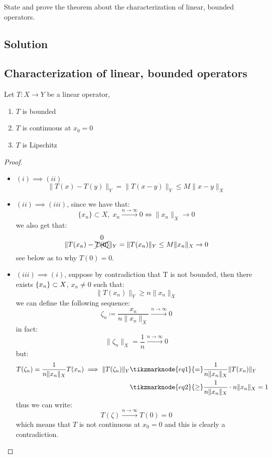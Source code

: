 
\question
State and prove the theorem about the characterization of linear, bounded operators.

\subsection*{Solution}

\subsection{Characterization of linear, bounded operators}
Let $T:X\to Y$ be a linear operator, \tfae
\begin{enumerate}
    \item $T$ is bounded
    \item $T$ is continuous at $x_0=0$
    \item $T$ is Lipschitz
\end{enumerate} 

\begin{proof}
    \hspace*{\fill}\\ %
    \begin{itemize}
        \item $(i) \implies (ii)$
            \[ \|T(x)-T(y)\|_Y = \|T(x-y)\|_Y \leq M \|x-y\|_X \]       
        \item $(ii) \implies (iii)$, since we have that:
            \[ \{x_n\}\subset X, \; x_n\xrightarrow{n\to\infty}0 \iff \|x_n\|_X \to 0 \]
            we also get that:
            \[ \|T(x_n)-\overset{\text{\normalsize0}}{\xcancel{T(0)}}\|_Y = \|T(x_n)\|_Y \leq M\|x_n\|_X \to 0\]
            see below as to why $T(0)=0$.
        \item $(iii) \implies (i)$, suppose by contradiction that T is not bounded, then there exists $\{ x_n \}\subset X$, $x_n\neq0$ such that:
            \[ \|T(x_n)\|_Y \geq n\|x_n\|_X \]
            we can define the following sequence:
            \[ \zeta_n \coloneqq \frac{x_n}{n\|x_n\|_X }\xrightarrow{n\to\infty}0\]
            in fact:
            \[ \|\zeta_n\|_X = \frac{1}{n} \xrightarrow{n\to\infty}0 \]
            but:
            \begin{align*}
                T(\zeta_n) = \frac{1}{n\|x_n\|_X} T(x_n) \implies \|T(\zeta_n)\|_Y & \tikzmarknode{eq1}{=} \frac{1}{n\|x_n\|_X} \|T(x_n)\|_Y \\
                & \tikzmarknode{eq2}{\geq} \frac{1}{n\|x_n\|_X} \cdot n \|x_n\|_X = 1\\
            \end{align*}
            \newpage %
            thus we can write:
            \[ T(\zeta) \xrightarrow{n\to\infty} T(0)=0 \]
            which means that $T$ is not continuous at $x_0=0$ and this is clearly a contradiction.
    \end{itemize}
\end{proof}

